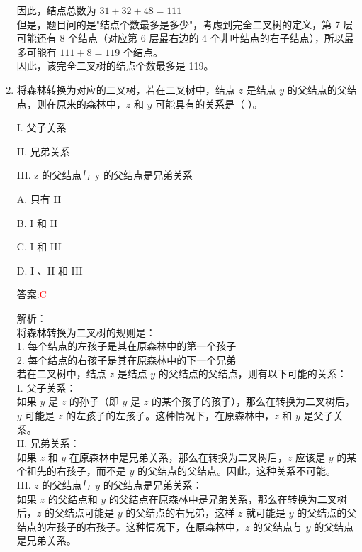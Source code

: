 \documentclass[lang=cn,newtx,10pt,scheme=chinese]{../../../elegantbook}
\begin{document}
\begin{enumerate}
        因此，结点总数为 $31 + 32 + 48 = 111$\\
        
        但是，题目问的是"结点个数最多是多少"，考虑到完全二叉树的定义，第 7 层可能还有 8 个结点（对应第 6 层最右边的 4 个非叶结点的右子结点），所以最多可能有 $111 + 8 = 119$ 个结点。\\
        
        因此，该完全二叉树的结点个数最多是 119。\\
    
        \item 将森林转换为对应的二叉树，若在二叉树中，结点 $z$ 是结点 $y$ 的父结点的父结点，则在原来的森林中，$z$ 和 $y$ 可能具有的关系是（ ）。  
        
        I. 父子关系  
    
        II. 兄弟关系  
    
        III. z 的父结点与 y 的父结点是兄弟关系  
    
        A. 只有 II  
    
        B. I 和 II  
    
        C. I 和 III  
    
        D. I 、II 和 III  
    
        答案:\textcolor{red}{C}
        
        解析：\\
        将森林转换为二叉树的规则是：\\
        1. 每个结点的左孩子是其在原森林中的第一个孩子\\
        2. 每个结点的右孩子是其在原森林中的下一个兄弟\\
        
        若在二叉树中，结点 $z$ 是结点 $y$ 的父结点的父结点，则有以下可能的关系：\\
        
        I. 父子关系：\\
        如果 $y$ 是 $z$ 的孙子（即 $y$ 是 $z$ 的某个孩子的孩子），那么在转换为二叉树后，$y$ 可能是 $z$ 的左孩子的左孩子。这种情况下，在原森林中，$z$ 和 $y$ 是父子关系。\\
        
        II. 兄弟关系：\\
        如果 $z$ 和 $y$ 在原森林中是兄弟关系，那么在转换为二叉树后，$z$ 应该是 $y$ 的某个祖先的右孩子，而不是 $y$ 的父结点的父结点。因此，这种关系不可能。\\
        
        III. $z$ 的父结点与 $y$ 的父结点是兄弟关系：\\
        如果 $z$ 的父结点和 $y$ 的父结点在原森林中是兄弟关系，那么在转换为二叉树后，$z$ 的父结点可能是 $y$ 的父结点的右兄弟，这样 $z$ 就可能是 $y$ 的父结点的父结点的左孩子的右孩子。这种情况下，在原森林中，$z$ 的父结点与 $y$ 的父结点是兄弟关系。\\
        

\end{enumerate}
\end{document}
